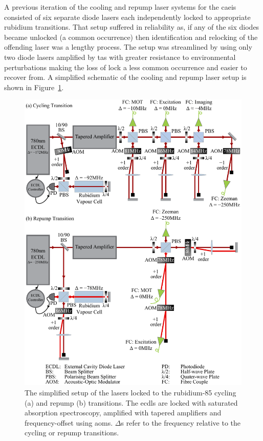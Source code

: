 A previous iteration of the cooling and repump laser systems for the \gls{caeis} consisted of six separate diode lasers each independently locked to appropriate rubidium transitions.
That setup suffered in reliability as, if any of the six diodes became unlocked (a common occurrence) then identification and relocking of the offending laser was a lengthy process.
The setup was streamlined by using only two diode lasers amplified by \glspl{ta} with greater resistance to environmental perturbations making the loss of lock a less common occurrence and easier to recover from.
A simplified schematic of the cooling and repump laser setup is shown in Figure~\ref{figure:laser_setup}.

\begin{figure}
    \center
    \includegraphics{part2/Figs/laser_setup.pdf}
    \caption[Simplified schematic of the laser setup for the \gls{caeis}.]{The simplified setup of the lasers locked to the rubidium-85 cycling (a) and repump (b) transitions.
    The \glspl{ecdl} are locked with saturated absorption spectroscopy, amplified with tapered amplifiers and frequency-offset using \glspl{aom}.
    $\Delta$s refer to the frequency relative to the cycling or repump transitions.}
    \label{figure:laser_setup}
\end{figure}

